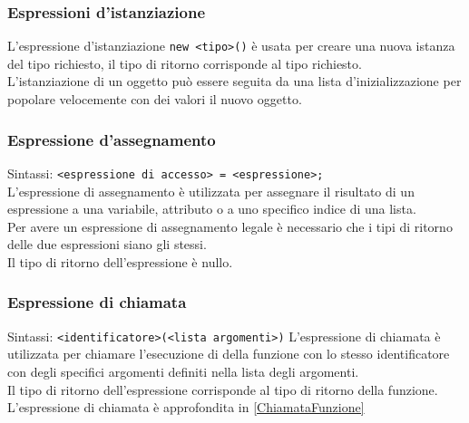 \subsubsection{Espressioni d'istanziazione}
L'espressione d'istanziazione \lstinline|new <tipo>()| è usata per creare una nuova istanza del tipo
richiesto, il tipo di ritorno corrisponde al tipo richiesto.
\\
L'istanziazione di un oggetto può essere seguita da una lista d'inizializzazione per popolare 
velocemente con dei valori il nuovo oggetto.

\subsubsection{Espressione d'assegnamento}
Sintassi: \lstinline|<espressione di accesso> = <espressione>;| \\
L'espressione di assegnamento è utilizzata per assegnare il risultato di un espressione
a una variabile, attributo o a uno specifico indice di una lista. \\
Per avere un espressione di assegnamento legale è necessario che i tipi di ritorno
delle due espressioni siano gli stessi. \\
Il tipo di ritorno dell'espressione è nullo.

\subsubsection{Espressione di chiamata}
Sintassi: \lstinline|<identificatore>(<lista argomenti>)|
L'espressione di chiamata è utilizzata per chiamare l'esecuzione di della funzione con lo 
stesso identificatore con degli specifici argomenti definiti nella lista degli argomenti. \\
Il tipo di ritorno dell'espressione corrisponde al tipo di ritorno della funzione. \\
L'espressione di chiamata è approfondita in \ref*{ChiamataFunzione}

